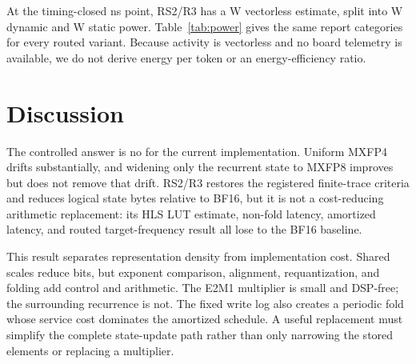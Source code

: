 \documentclass[conference]{IEEEtran}
\begin{document}
At the timing-closed \RsTwoRouteClosingPeriodNs{} ns point, RS2/R3 has a
\RsTwoRoutePowerW{} W vectorless estimate, split into
\RsTwoRouteDynamicW{} W dynamic and \RsTwoRouteStaticW{} W static power.
Table~\ref{tab:power} gives the same report categories for every routed
variant. Because activity is vectorless and no board telemetry is available,
we do not derive energy per token or an energy-efficiency ratio.

\begin{table}[t]
\centering
\caption{Vivado vectorless power components at each variant's first passing
tested clock point. These are tool estimates, not board measurements.}
\label{tab:power}
\scriptsize
\resizebox{\columnwidth}{!}{}
\end{table}

\section{Discussion}
The controlled answer is no for the current implementation. Uniform MXFP4
drifts substantially, and widening only the recurrent state to MXFP8 improves
but does not remove that drift. RS2/R3 restores the registered finite-trace
criteria and reduces logical state bytes relative to BF16, but it is not a
cost-reducing arithmetic replacement: its HLS LUT estimate, non-fold latency,
amortized latency, and routed target-frequency result all lose to the BF16
baseline.

This result separates representation density from implementation cost. Shared
scales reduce bits, but exponent comparison, alignment, requantization, and
folding add control and arithmetic. The E2M1 multiplier is small and DSP-free;
the surrounding recurrence is not. The fixed write log also creates a periodic
fold whose service cost dominates the amortized schedule. A useful replacement
must simplify the complete state-update path rather than only narrowing the
stored elements or replacing a multiplier.
\end{document}
